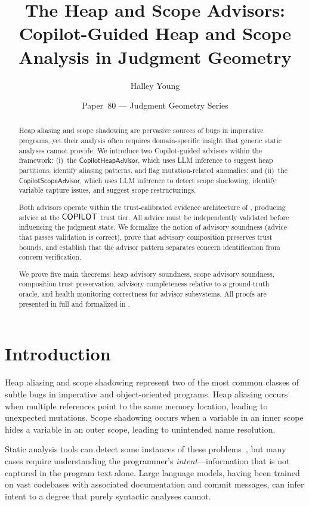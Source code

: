 \documentclass[11pt]{article}
\title{\textbf{The Heap and Scope Advisors:\\
Copilot-Guided Heap and Scope Analysis in Judgment Geometry}}
\author{Halley Young}
\date{Paper~80 --- Judgment Geometry Series}
\newcommand{\HeapAdv}{\mathsf{CopilotHeapAdvisor}}
\newcommand{\ScopeAdv}{\mathsf{CopilotScopeAdvisor}}
\begin{document}
\maketitle

\begin{abstract}
Heap aliasing and scope shadowing are pervasive sources of bugs in
imperative programs, yet their analysis often requires domain-specific
insight that generic static analyses cannot provide.  We introduce
two Copilot-guided advisors within the \JuGeo{} framework:
(i)~the $\HeapAdv$, which uses LLM inference to suggest heap
partitions, identify aliasing patterns, and flag mutation-related
anomalies; and
(ii)~the $\ScopeAdv$, which uses LLM inference to detect scope
shadowing, identify variable capture issues, and suggest scope
restructurings.

Both advisors operate within the trust-calibrated evidence
architecture of \JuGeo{}, producing advice at the $\mathsf{COPILOT}$
trust tier.  All advice must be independently validated before
influencing the judgment state.  We formalize the notion of
advisory soundness (advice that passes validation is correct),
prove that advisory composition preserves trust bounds, and
establish that the advisor pattern separates concern identification
from concern verification.

We prove five main theorems: heap advisory soundness, scope advisory
soundness, composition trust preservation, advisory completeness
relative to a ground-truth oracle, and health monitoring correctness
for advisor subsystems.  All proofs are presented in full and
formalized in \LEAN.
\end{abstract}

\section{Introduction}
\label{sec:intro}

Heap aliasing and scope shadowing represent two of the most
common classes of subtle bugs in imperative and object-oriented
programs.  Heap aliasing occurs when multiple references point to
the same memory location, leading to unexpected mutations.
Scope shadowing occurs when a variable in an inner scope hides
a variable in an outer scope, leading to unintended name
resolution.

Static analysis tools can detect some instances of these
problems~\cite{hoare1969axiomatic}, but many cases require
understanding the programmer's \emph{intent}---information that
is not captured in the program text alone.  Large language models,
having been trained on vast codebases with associated documentation
and commit messages, can infer intent to a degree that purely
syntactic analyses cannot.
\end{document}

